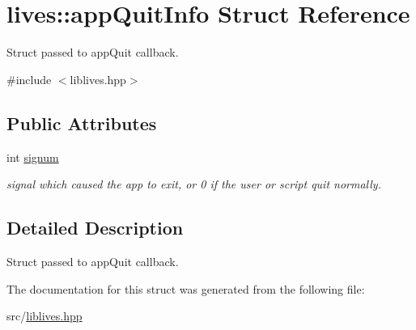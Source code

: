 \hypertarget{structlives_1_1appQuitInfo}{\section{lives\-:\-:app\-Quit\-Info Struct Reference}
\label{structlives_1_1appQuitInfo}
}


Struct passed to app\-Quit callback.  




{\ttfamily \#include $<$liblives.\-hpp$>$}

\subsection*{Public Attributes}
\begin{DoxyCompactItemize}
\item 
\hypertarget{structlives_1_1appQuitInfo_a8b624e2fc96ef8aeffe569d92d41b5dd}{int \hyperlink{structlives_1_1appQuitInfo_a8b624e2fc96ef8aeffe569d92d41b5dd}{signum}}\label{structlives_1_1appQuitInfo_a8b624e2fc96ef8aeffe569d92d41b5dd}

\begin{DoxyCompactList}\small\item\em signal which caused the app to exit, or 0 if the user or script quit normally. \end{DoxyCompactList}\end{DoxyCompactItemize}


\subsection{Detailed Description}
Struct passed to app\-Quit callback. 

The documentation for this struct was generated from the following file\-:\begin{DoxyCompactItemize}
\item 
src/\hyperlink{liblives_8hpp}{liblives.\-hpp}\end{DoxyCompactItemize}
